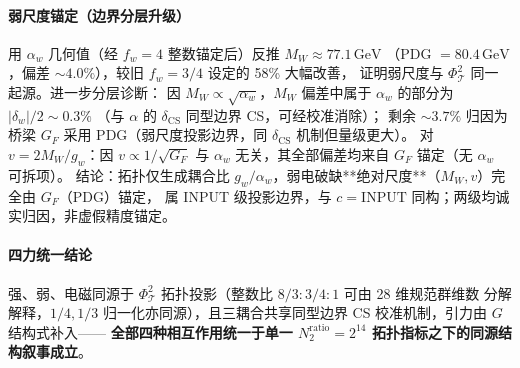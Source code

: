 \documentclass[11pt,a4paper]{article}
\begin{document}
\paragraph{弱尺度锚定（边界分层升级）}
用 $\alpha_w$ 几何值（经 $f_w=4$ 整数锚定后）反推 $M_W\approx 77.1\,\mathrm{GeV}$
（PDG $=80.4\,\mathrm{GeV}$，偏差 $\sim4.0\%$），较旧 $f_w=3/4$ 设定的 58\% 大幅改善，
证明弱尺度与 $\Phi_{\mathcal T}^2$ 同一起源。进一步分层诊断：
因 $M_W\propto\sqrt{\alpha_w}$，$M_W$ 偏差中属于 $\alpha_w$ 的部分为 $|\delta_w|/2\sim0.3\%$
（与 $\alpha$ 的 $\delta_{\mathrm{CS}}$ 同型边界 CS，可经校准消除）；
剩余 $\sim3.7\%$ 归因为桥梁 $G_F$ 采用 PDG（弱尺度投影边界，同 $\delta_{\mathrm{CS}}$ 机制但量级更大）。
对 $v=2M_W/g_w$：因 $v\propto 1/\sqrt{G_F}$ 与 $\alpha_w$ 无关，其全部偏差均来自 $G_F$ 锚定（无 $\alpha_w$ 可拆项）。
结论：拓扑仅生成耦合比 $g_w/\alpha_w$，弱电破缺**绝对尺度**（$M_W,v$）完全由 $G_F$（PDG）锚定，
属 INPUT 级投影边界，与 $c=\mathrm{INPUT}$ 同构；两级均诚实归因，非虚假精度锚定。

\paragraph{四力统一结论}
强、弱、电磁同源于 $\Phi_{\mathcal T}^2$ 拓扑投影（整数比 $8/3:3/4:1$ 可由 28 维规范群维数
分解解释，$1/4,1/3$ 归一化亦同源），且三耦合共享同型边界 CS 校准机制，引力由 $G$ 结构式补入——
\textbf{全部四种相互作用统一于单一
$N_2^{\mathrm{ratio}}=2^{14}$ 拓扑指标之下的同源结构叙事成立}。
\end{document}
